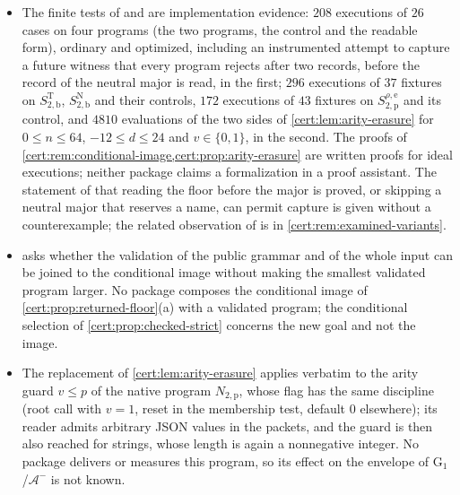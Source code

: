 \begin{itemize}
formulas and of certificates can share an invariant with the checking of proofs,
so that the strict programs approach the compact envelope with the same accepted
public language; and which reductions give a gain that is robust across
implementations, measured by a fixed abstract machine, decoder and public
grammar. No package gives a result on these questions.
\item The finite tests of  and
 are implementation evidence: $208$ executions of
$26$ cases on four programs (the two programs, the control and the readable form),
ordinary and optimized, including an instrumented attempt to capture a future
witness that every program rejects after two records, before the record of the
neutral major is read, in the first; $296$ executions of $37$ fixtures on
$S^{\mathrm T}_{2,\mathrm b}$, $S^{\mathrm N}_{2,\mathrm b}$ and their controls,
$172$ executions of $43$ fixtures on $S^{\rho,\mathrm e}_{2,\mathrm p}$ and its
control, and $4810$ evaluations of the two sides of
\cref{cert:lem:arity-erasure} for $0\le n\le 64$, $-12\le d\le 24$ and
$v\in\{0,1\}$, in the second. The proofs of
\cref{cert:rem:conditional-image,cert:prop:arity-erasure} are written proofs for
ideal executions; neither package claims a formalization in a proof assistant. The
statement of  that reading the floor before the major is
proved, or skipping a neutral major that reserves a name, can permit capture is
given without a counterexample; the related observation of 
is in \cref{cert:rem:examined-variants}.
\item {} asks whether the validation of the public grammar and
of the whole input can be joined to the conditional image without making the
smallest validated program larger. No package composes the conditional image of
\cref{cert:prop:returned-floor}(a) with a validated program; the conditional
selection of \cref{cert:prop:checked-strict} concerns the new goal and not the
image.
\item The replacement of \cref{cert:lem:arity-erasure} applies verbatim to the
arity guard $v\le p$ of the native program $N_{2,\mathrm p}$, whose flag has the
same discipline (root call with $v=1$, reset in the membership test, default $0$
elsewhere); its reader admits arbitrary JSON values in the packets, and the guard
is then also reached for strings, whose length is again a nonnegative integer.
No package delivers or measures this program, so its effect on the envelope of
G$_1$/$\mathcal A^{-}$ is not known.

\end{itemize}

